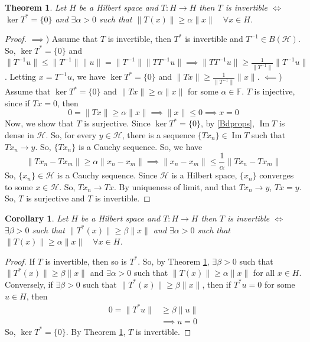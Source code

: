 \documentclass{report}
\newtheorem{thm}{Theorem}
\newtheorem{cor}{Corollary}
\newcommand{\im}{\operatorname{Im}}
\begin{document}
\begin{thm} \label{Inv}
Let $H$ be a Hilbert space and $T: H \rightarrow H$ then $T$ is invertible $\Longleftrightarrow$  $\operatorname{ker}T^{*}=\{0\}$ and $\exists \alpha>0$ such that $\|T(x)\| \geqslant \alpha\|x\| \quad \forall x \in H$.
\end{thm}
\begin{proof}
  $\implies$) Assume that $T$ is invertible, then $T^{*}$ is invertible and $T^{-1}\in B(\mathcal{H})$. So, $\ker T^{*}=\{0\}$ and $\|T^{-1}u\|\leq\|T^{-1}\|\|u\|=\|T^{-1}\|\|TT^{-1}u\|\implies\|TT^{-1}u\|\geq\frac{1}{\|T^{-1}\|}\|T^{-1}u\|$. Letting $x=T^{-1}u$, we have $\ker T^{*}=\{0\}$ and $\|Tx\|\geq\frac{1}{\|T^{-1}\|}\|x\|$.
  \newline
  $\impliedby$) Assume that $\ker T^{*}=\{0\}$ and $\|Tx\|\geq\alpha\|x\|$ for some $\alpha\in\mathbb{F}$. $T$ is injective, since if $Tx=0$, then
  $$
  0=\|Tx\|\geq\alpha\|x\|\implies\|x\|\leq 0\implies x=0
  $$
  Now, we show that $T$ is surjective. Since $\ker T^{*}=\{0\}$, by \ref{Bdprops}, $\im T$ is dense in $\mathcal{H}$. So, for every $y\in\mathcal{H}$, there is a sequence $\{Tx_{n}\}\in\im T$ such that $Tx_{n}\to y$. So, $\{Tx_{n}\}$ is a Cauchy sequence. So, we have
  $$
  \|Tx_{n}-Tx_{m}\|\geq\alpha\|x_{n}-x_{m}\|\implies\|x_{n}-x_{m}\|\leq\frac{1}{\alpha}\|Tx_{n}-Tx_{m}\|
  $$
  So, $\{x_{n}\}\in\mathcal{H}$ is a Cauchy sequence. Since $\mathcal{H}$ is a Hilbert space, $\{x_{n}\}$ converges to some $x\in\mathcal{H}$. So, $Tx_{n}\to Tx$. By uniqueness of limit, and that $Tx_{n}\to y$, $Tx=y$. So, $T$ is surjective and $T$ is invertible.
\end{proof}

\begin{cor} \label{CorInv}
Let $H$ be a Hilbert space and $T: H \rightarrow H$ then $T$ is invertible $\Longleftrightarrow$ $\exists \beta>0$ such that $\|T^{*}(x)\| \geqslant \beta\|x\|$ and $\exists \alpha>0$ such that $\|T(x)\| \geqslant \alpha\|x\| \quad \forall x \in H$.
\end{cor}
\begin{proof}
  If $T$ is invertible, then so is $T^{*}$. So, by Theorem \ref{Inv}, $\exists \beta>0$ such that $\|T^{*}(x)\| \geqslant \beta\|x\|$ and $\exists \alpha>0$ such that $\|T(x)\| \geqslant \alpha\|x\|$ for all $x\in H$. Conversely, if $\exists \beta>0$ such that $\|T^{*}(x)\| \geqslant \beta\|x\|$, then if $T^{*}u=0$ for some $u\in H$, then
  $$
  \begin{aligned}
  0 = \lVert T^{*}u\rVert&\geq\beta\lVert u\rVert \\
                         &\implies u=0
  \end{aligned}
  $$
  So, $\ker T^{*}=\{0\}$. By Theorem \ref{Inv}, $T$ is invertible.
\end{proof}
\end{document}
